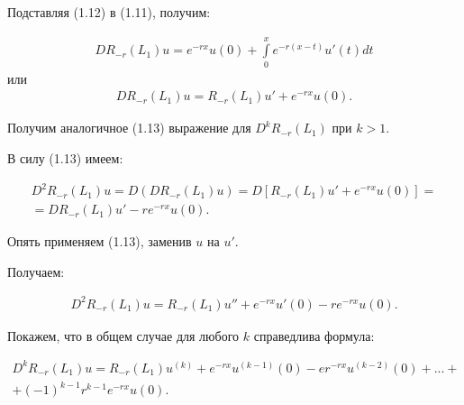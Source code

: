 Подставляя (1.12) в (1.11), получим:

\begin{equation}
\begin{array}{c}
\nonumber

DR_{-r}(L_1)u = e^{-rx}u(0) + \int\limits_0^x e^{-r(x-t)}u'(t)dt

\end{array}
\end{equation}	
или
\begin{equation}
\begin{array}{c}

DR_{-r}(L_1)u = R_{-r}(L_1)u' + e^{-rx}u(0).

\end{array}
\end{equation}

Получим аналогичное (1.13) выражение для $ D^kR_{-r}(L_1) $ при $ k > 1 $. 

В силу (1.13) имеем:

\begin{equation}
\begin{array}{c}
\nonumber

D^2R_{-r}(L_1)u = D(DR_{-r}(L_1)u) = D[R_{-r}(L_1)u' + e^{-rx}u(0)] = \\
= DR_{-r}(L_1)u' - re^{-rx}u(0).

\end{array}
\end{equation}

Опять применяем (1.13), заменив $ u $ на $ u' $.

Получаем:

\begin{equation}
\begin{array}{c}
\nonumber

D^2R_{-r}(L_1)u = R_{-r}(L_1)u'' + e^{-rx}u'(0) - re^{-rx}u(0).

\end{array}
\end{equation}

Покажем, что в общем случае для любого $ k $ справедлива формула:

\begin{equation}
\begin{array}{c}

D^kR_{-r}(L_1)u = R_{-r}(L_1)u^{(k)} + e^{-rx}u^{(k-1)}(0) -er^{-rx}u^{(k-2)}(0) + ... + \\
+ (-1)^{k-1}r^{k-1}e^{-rx}u(0).

\end{array}
\end{equation}

